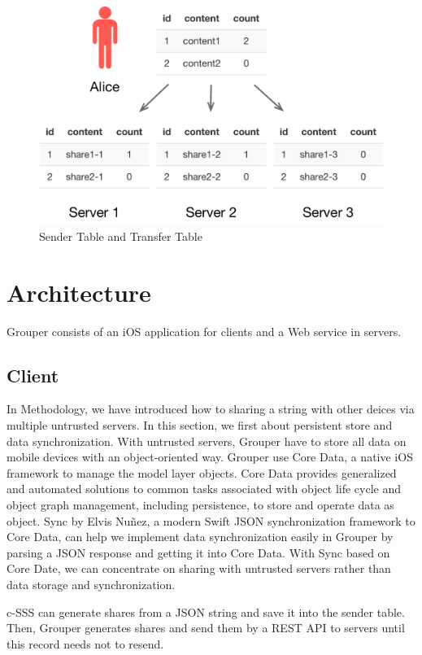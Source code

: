 \documentclass[twocolumn,10pt]{article}
\begin{document}
\begin{figure}[t]
\centering
\includegraphics[scale=0.4]{sync_table}
\caption{Sender Table and Transfer Table}
\end{figure}

\section{Architecture}
Grouper consists of an iOS application for clients and a Web service in servers.

\subsection{Client}
In Methodology, we have introduced how to sharing a string with other deices via multiple untrusted servers. In this section, we first about persistent store and data synchronization. With untrusted servers, Grouper have to store all data on mobile devices with an object-oriented way. Grouper use Core Data\cite{coredata}, a native iOS framework to manage the model layer objects. Core Data provides generalized and automated solutions to common tasks associated with object life cycle and object graph management, including persistence, to store and operate data as object. Sync\cite{sync} by Elvis Nuñez, a modern Swift JSON synchronization framework to Core Data, can help we implement data synchronization easily in Grouper by parsing a JSON response and getting it into Core Data. With Sync based on Core Date, we can concentrate on sharing with untrusted servers rather than data storage and synchronization.

c-SSS can generate shares from a JSON string and save it into the sender table. Then, Grouper generates shares and send them by a REST API to servers until this record needs not to resend.
\end{document}
